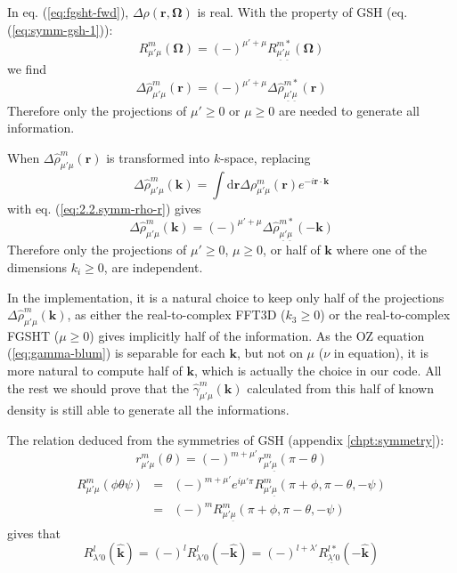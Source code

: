 In eq. (\ref{eq:fgsht-fwd}), $\Delta\rho(\mathbf{r},\mathbf{\Omega})$
is real. With the property of \acs{GSH} (eq. (\ref{eq:symm-gsh-1})):
\begin{equation}
R_{\mu'\mu}^{m}(\mathbf{\Omega})=(-)^{\mu'+\mu}R_{\underline{\mu'}\underline{\mu}}^{m*}(\mathbf{\Omega})
\end{equation}
we find
\begin{equation}
\Delta\hat{\rho}_{\mu'\mu}^{m}(\mathbf{r})=(-)^{\mu'+\mu}\Delta\hat{\rho}_{\underline{\mu'}\underline{\mu}}^{m*}(\mathbf{r})\label{eq:2.2.symm-rho-r}
\end{equation}
Therefore only the projections of $\mu'\geq0$ or $\mu\geq0$ are
needed to generate all information.

When $\Delta\hat{\rho}_{\mu'\mu}^{m}(\mathbf{r})$ is transformed
into $k$-space, replacing
\begin{equation}
\Delta\hat{\rho}_{\mu'\mu}^{m}(\mathbf{k})=\int\mathrm{d}\mathbf{r}\Delta\rho_{\mu'\mu}^{m}(\mathbf{r})e^{-i\mathbf{r}\cdot\mathbf{k}}
\end{equation}
 with eq. (\ref{eq:2.2.symm-rho-r}) gives
\begin{equation}
\Delta\hat{\rho}_{\mu'\mu}^{m}(\mathbf{k})=(-)^{\mu'+\mu}\Delta\hat{\rho}_{\underline{\mu'}\underline{\mu}}^{m*}(-\mathbf{k})\label{eq:2.2.symm-rho-k}
\end{equation}
Therefore only the projections of $\mu'\geq0$, $\mu\geq0$, or half of $\mathbf{k}$ where one of the dimensions $k_{i}\geq0$, are
independent. 

In the implementation, it is a natural choice to keep only half
of the projections $\Delta\hat{\rho}_{\mu'\mu}^{m}(\mathbf{k})$, as either
the real-to-complex \acs{FFT}3D ($k_{3}\geq0$) or the real-to-complex
\acs{FGSHT} ($\mu\geq0$) gives implicitly half of the information.
As the \acs{OZ} equation (\ref{eq:gamma-blum}) is separable for
each $\mathbf{k}$, but not on $\mu$ ($\nu$ in equation), it is
more natural to compute half of $\mathbf{k}$, which is actually the
choice in our code. All the rest we should prove that the $\hat{\gamma}_{\mu'\mu}^{m}(\mathbf{k})$
calculated from this half of known density is still able to generate
all the informations.

The relation deduced from the symmetries of \acs{GSH} (appendix \ref{chpt:symmetry}):
\begin{equation}
r_{\mu'\mu}^{m}(\theta)=(-)^{m+\mu'}r_{\mu'\underline{\mu}}^{m}(\pi-\theta)
\end{equation}
\begin{eqnarray}
R_{\mu'\mu}^{m}(\phi\theta\psi) & = & (-)^{m+\mu'}e^{i\mu'\pi}R_{\mu'\underline{\mu}}^{m}(\pi+\phi,\pi-\theta,-\psi)\\
 & = & (-)^{m}R_{\mu'\underline{\mu}}^{m}(\pi+\phi,\pi-\theta,-\psi)
\end{eqnarray}
gives that
\begin{equation}
R_{\lambda'0}^{l}(\hat{\mathbf{k}})=(-)^{l}R_{\lambda'0}^{l}(-\hat{\mathbf{k}})=(-)^{l+\lambda'}R_{\underline{\lambda'}0}^{l*}(-\hat{\mathbf{k}})\label{eq:2.2.symm-lambda}
\end{equation}

